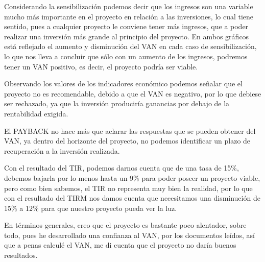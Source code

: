 \begin{enumerate}[(a)]
          Considerando la sensibilización podemos decir que los ingresos son una variable
          mucho más importante en el proyecto en relación a las inversiones,
          lo cual tiene sentido, pues a cualquier proyecto le conviene tener más ingresos,
          que a poder realizar una inversión más grande al principio del proyecto.
          En ambos gráficos está reflejado el aumento y disminución del VAN en cada caso
          de sensibilización, lo que nos lleva a concluir que sólo con un aumento
          de los ingresos, podremos tener un VAN positivo, es decir, el proyecto
          podría ser viable.

          Observando los valores de los indicadores económico podemos señalar que el proyecto
          no es recomendable, debido a que el VAN es negativo, por lo que debiese ser rechazado,
          ya que la inversión produciría ganancias por debajo de la rentabilidad exigida.

          El PAYBACK no hace más que aclarar las respuestas que se pueden obtener del VAN,
          ya dentro del horizonte del proyecto, no podemos identificar un plazo de recuperación
          a la inversión realizada.

          Con el resultado del TIR, podemos darnos cuenta que de una tasa de 15\%,
          debemos bajarla por lo menos hasta un 9\% para poder poseer un proyecto viable,
          pero como bien sabemos, el TIR no representa muy bien la realidad,
          por lo que con el resultado del TIRM nos damos cuenta que necesitamos una disminución
          de 15\% a 12\% para que nuestro proyecto pueda ver la luz.

          En términos generales, creo que el proyecto es bastante poco alentador,
          sobre todo, pues he desarrollado una confianza al VAN, por los documentos leídos,
          así que a penas calculé el VAN, me di cuenta que el proyecto no daría buenos resultados.
           

\end{enumerate}
